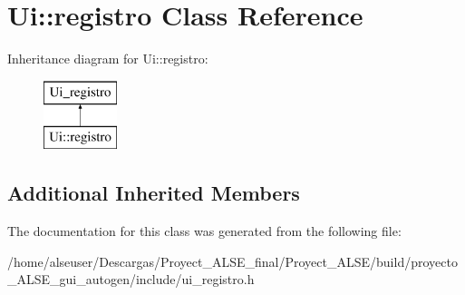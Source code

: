 \hypertarget{class_ui_1_1registro}{}\section{Ui\+:\+:registro Class Reference}
\label{class_ui_1_1registro}
Inheritance diagram for Ui\+:\+:registro\+:\begin{figure}[H]
\begin{center}
\leavevmode
\includegraphics[height=2.000000cm]{class_ui_1_1registro}
\end{center}
\end{figure}
\subsection*{Additional Inherited Members}


The documentation for this class was generated from the following file\+:\begin{DoxyCompactItemize}
\item 
/home/alseuser/\+Descargas/\+Proyect\+\_\+\+A\+L\+S\+E\+\_\+final/\+Proyect\+\_\+\+A\+L\+S\+E/build/proyecto\+\_\+\+A\+L\+S\+E\+\_\+gui\+\_\+autogen/include/ui\+\_\+registro.\+h\end{DoxyCompactItemize}
